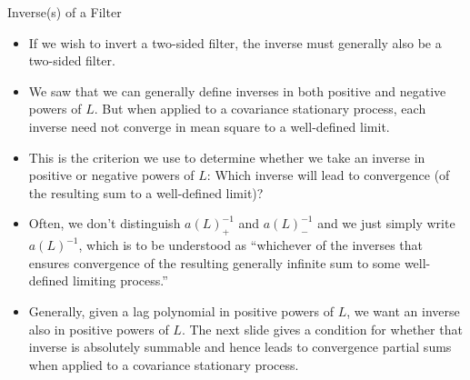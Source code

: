 \documentclass[aspectratio=169, handout]{beamer}
\begin{document}
{\footnotesize
\begin{frame}{Inverse(s) of a Filter}
\begin{itemize}
  \item If we wish to invert a two-sided filter, the inverse must
    generally also be a two-sided filter.

  \pause
  \item We saw that we can generally define inverses in \alert{both}
    positive and negative powers of $L$.
    But when applied to a covariance stationary process, each inverse
    \alert{need not} converge in mean square to a well-defined limit.

  \item
    This is the criterion we use to determine whether we take an inverse
    in \alert{positive} or \alert{negative} powers of $L$:
    Which inverse will lead to \alert{convergence} (of the resulting sum
    to a well-defined limit)?

  \pause
  \item Often, we don't distinguish $a(L)^{-1}_+$ and $a(L)^{-1}_-$ and
    we just simply write $a(L)^{-1}$, which is to be understood as
    ``whichever of the inverses that ensures convergence of the
    resulting generally infinite sum to some well-defined limiting
    process.''

  \pause
  \item Generally, given a lag polynomial in positive powers of $L$, we
    want an inverse \alert{also in positive powers} of $L$.
    The next slide gives a condition for whether that inverse is
    absolutely summable and hence leads to convergence partial sums when
    applied to a covariance stationary process.
\end{itemize}
\end{frame}
}
\end{document}
